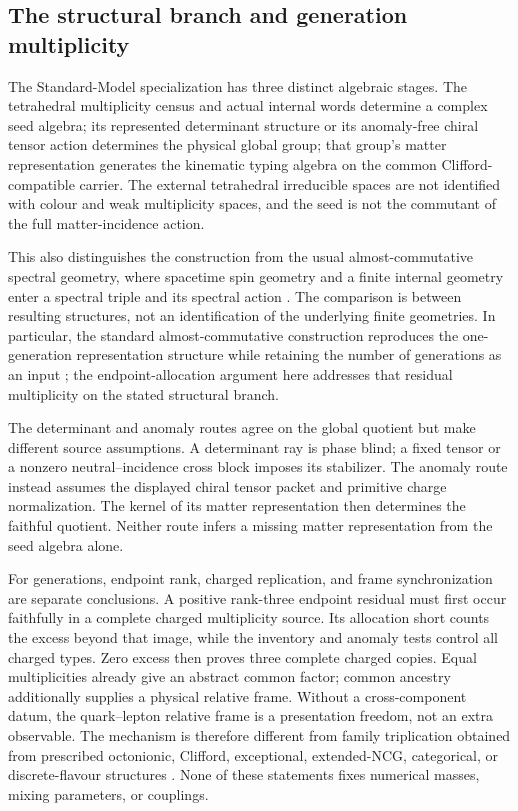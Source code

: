 \documentclass[11pt]{article}
\numberwithin{equation}{section}
\theoremstyle{definition}
\theoremstyle{remark}
\begin{document}
\subsection{The structural branch and generation multiplicity}

The Standard-Model specialization has three distinct algebraic stages.
The tetrahedral multiplicity census and actual internal words determine a
complex seed algebra; its represented determinant structure or its anomaly-free
chiral tensor action determines the physical global group; that group's
matter representation generates the kinematic typing algebra on the common
Clifford-compatible carrier.  The external tetrahedral irreducible spaces
are not identified with colour and weak multiplicity spaces, and the seed
is not the commutant of the full matter-incidence action.

This also distinguishes the construction from the usual almost-commutative
spectral geometry, where spacetime spin geometry and a finite internal
geometry enter a spectral triple and its spectral action
\cite{ConnesGravityMatter1996,ChamseddineConnes1997,
ChamseddineConnesMarcolli2007,ChamseddineConnes2008,
vanDenDungenVanSuijlekom2012}.  The comparison is between resulting
structures, not an identification of the underlying finite geometries.  In
particular, the standard almost-commutative construction reproduces the
one-generation representation structure while retaining the number of
generations as an input \cite{ChamseddineConnes2008}; the endpoint-allocation
argument here addresses that residual multiplicity on the stated structural
branch.

The determinant and anomaly routes agree on the global quotient but make
different source assumptions.  A determinant ray is phase blind; a fixed
tensor or a nonzero neutral--incidence cross block imposes its stabilizer.
The anomaly route instead assumes the displayed chiral tensor packet and
primitive charge normalization.  The kernel of its matter representation
then determines the faithful quotient.  Neither route infers a missing
matter representation from the seed algebra alone.

For generations, endpoint rank, charged replication, and frame synchronization
are separate conclusions.  A positive rank-three endpoint residual must
first occur faithfully in a complete charged multiplicity source.  Its
allocation short counts the excess beyond that image, while the inventory
and anomaly tests control all charged types.  Zero excess then proves three
complete charged copies.  Equal multiplicities already give an abstract
common factor; common ancestry additionally supplies a physical relative
frame.  Without a cross-component datum, the quark--lepton relative frame is
a presentation freedom, not an extra observable.  The mechanism is therefore
different from family triplication obtained from prescribed octonionic,
Clifford, exceptional, extended-NCG, categorical, or discrete-flavour
structures \cite{Furey2018,Gresnigt2026,Baez2026,YuMa2018,Patrascu2026,AltarelliFeruglio2010}.
None of these statements fixes numerical masses, mixing parameters, or
couplings.
\end{document}
